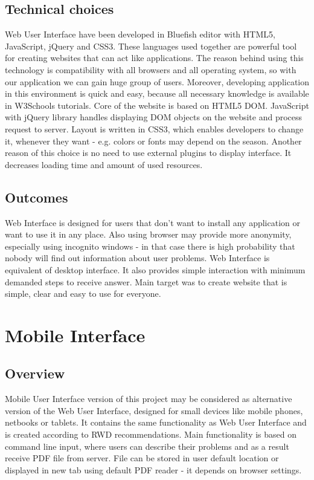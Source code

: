 \documentclass[a4paper,12pt, twocolumn]{article}
\begin{document}
\subsection*{Technical choices}

Web User Interface have been developed in Bluefish editor with HTML5, JavaScript, jQuery and CSS3. These languages used together are powerful tool for creating websites that can act like applications. The reason behind using this technology is compatibility with all browsers and all operating system, so with our application we can gain huge group of users. Moreover, developing application in this environment is quick and easy, because all necessary knowledge is available in W3Schools tutorials. Core of the website is based on HTML5 DOM.  JavaScript with jQuery library handles displaying DOM objects on the website and process request to server. Layout is written in CSS3, which enables developers to change it, whenever they want - e.g. colors or fonts may depend on the season. Another reason of this choice is no need to use external plugins to display interface. It decreases loading time and amount of used resources.

\subsection*{Outcomes}
Web Interface is designed for users that don't want to install any application or want to use it in any place. Also using browser may provide more anonymity, especially using incognito windows - in that case there is high probability that nobody will find out information about user problems. Web Interface is equivalent of desktop interface. It also provides simple interaction with minimum demanded steps to receive answer. Main target was to create website that is simple, clear and easy to use for everyone.



\section*{Mobile Interface}

\subsection*{Overview}

Mobile User Interface version of this project may be considered as alternative version of the Web User Interface, designed for small devices like mobile phones, netbooks or tablets. It contains the same functionality as Web User Interface and is created according to RWD recommendations. Main functionality is based on command line input, where users can describe their problems and as a result receive PDF ﬁle from server. File can be stored in user default location or displayed in new tab using default PDF reader - it depends on browser settings. 
\end{document}
